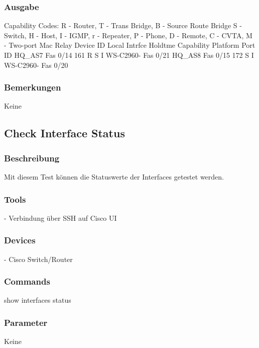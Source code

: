 \documentclass[a4,12pt]{scrartcl}
\begin{document}
\subsubsection{Ausgabe}
Capability Codes: R - Router, T - Trans Bridge, B - Source Route Bridge\newline
                  S - Switch, H - Host, I - IGMP, r - Repeater, P - Phone,\newline
                  D - Remote, C - CVTA, M - Two-port Mac Relay\newline
Device ID        Local Intrfce     Holdtme    Capability  Platform  Port ID\newline
HQ_AS7           Fas 0/14          161             R S I  WS-C2960- Fas 0/21\newline
HQ_AS8           Fas 0/15          172              S I   WS-C2960- Fas 0/20\newline
\subsubsection{Bemerkungen}
Keine




\subsection{Check Interface Status}
\subsubsection{Beschreibung}
Mit diesem Test können die Statuswerte der Interfaces getestet werden.
\subsubsection{Tools}
- Verbindung über SSH auf Cisco UI
\subsubsection{Devices}
- Cisco Switch/Router
\subsubsection{Commands}
show interfaces status
\subsubsection{Parameter}
Keine
\end{document}
